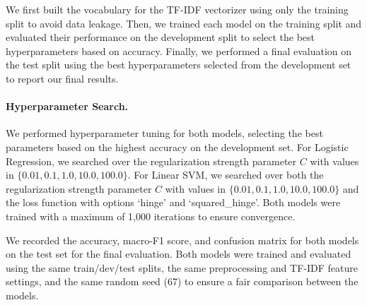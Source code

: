 
We first built the vocabulary for the TF-IDF vectorizer using only the training split to avoid data leakage. Then, we trained each model on the training split and evaluated their performance on the development split to select the best hyperparameters based on accuracy. Finally, we performed a final evaluation on the test split using the best hyperparameters selected from the development set to report our final results.

\paragraph{Hyperparameter Search.} We performed hyperparameter tuning for both models, selecting the best parameters based on the highest accuracy on the development set. For Logistic Regression, we searched over the regularization strength parameter $C$ with values in $\{0.01, 0.1, 1.0, 10.0, 100.0\}$. For Linear SVM, we searched over both the regularization strength parameter $C$ with values in $\{0.01, 0.1, 1.0, 10.0, 100.0\}$ and the loss function with options `hinge' and `squared\_hinge'. Both models were trained with a maximum of 1,000 iterations to ensure convergence.

We recorded the accuracy, macro-F1 score, and confusion matrix for both models on the test set for the final evaluation. Both models were trained and evaluated using the same train/dev/test splits, the same preprocessing and TF-IDF feature settings, and the same random seed (67) to ensure a fair comparison between the models.